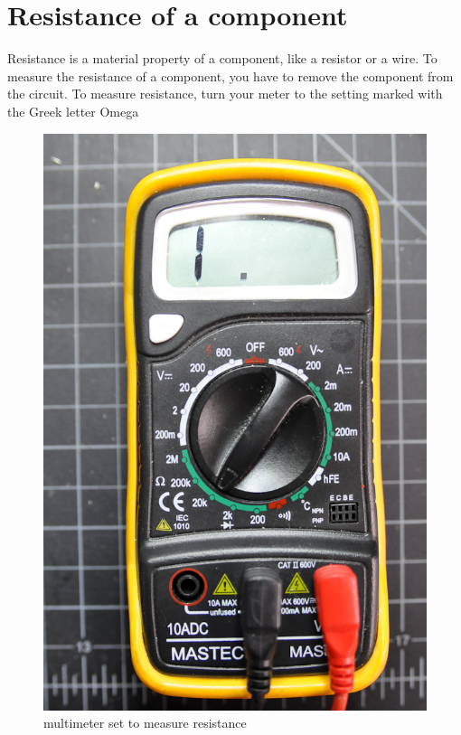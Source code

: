 \section{Resistance of a component}

Resistance is a material property of a component, like a resistor or a wire. To measure the resistance of a component, you have to remove the component from the circuit. To measure resistance, turn your meter to the setting marked with the Greek letter Omega %

\begin{figure}[!htb]
 \centering
 \includegraphics[scale=0.3]{img/electronics/multimeter_resistance.jpg}
 \caption{multimeter set to measure resistance}
 \label{multimeter set to measure resistance}
\end{figure}

